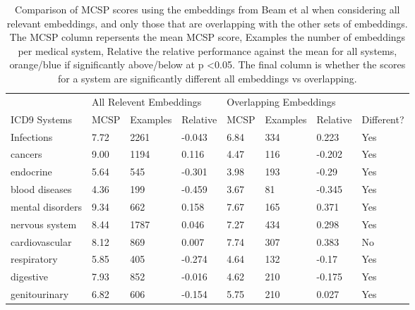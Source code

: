 \documentclass[10pt]{article}
\def\blu#1{{\color{blu}#1}}
\def\ora#1{{\color{ora}#1}}
\begin{document}
\begin{table*}[]
	\caption{Comparison of MCSP scores using the embeddings from Beam et al when considering all relevant embeddings, and only those that are overlapping with the other sets of embeddings. The MCSP column repersents the mean MCSP score, Examples the number of embeddings per medical system, Relative the relative performance against the mean for all systems, orange/blue if significantly above/below at p \textless 0.05. The final column is whether the scores for a system are significantly different all embeddings vs overlapping.}
	\label{tab:onlybeamonlymcsp}
	\begin{tabular}{llllllll}
		& \multicolumn{3}{l}{All Relevent Embeddings} & \multicolumn{3}{l}{Overlapping Embeddings} &            \\
		ICD9 Systems         & MCSP      & Examples     & Relative         & MCSP     & Examples     & Relative         & Different? \\
		Infections           & 7.72      & 2261         & \blu{-0.043}     & 6.84     & 334          & 0.223            & Yes        \\
		cancers              & 9.00      & 1194         & 0.116            & 4.47     & 116          & \blu{-0.202}     & Yes        \\
		endocrine            & 5.64      & 545          & \blu{-0.301}     & 3.98     & 193          & \blu{-0.29}      & Yes        \\
		blood diseases       & 4.36      & 199          & \blu{-0.459}     & 3.67     & 81           & \blu{-0.345}     & Yes        \\
		mental disorders     & 9.34      & 662          & 0.158            & 7.67     & 165          & 0.371            & Yes        \\
		nervous system       & 8.44      & 1787         & \ora{0.046}      & 7.27     & 434          & 0.298            & Yes        \\
		cardiovascular       & 8.12      & 869          & \ora{0.007}      & 7.74     & 307          & 0.383            & No         \\
		respiratory          & 5.85      & 405          & \blu{-0.274}     & 4.64     & 132          & \blu{-0.17}      & Yes        \\
		digestive            & 7.93      & 852          & \blu{-0.016}     & 4.62     & 210          & \blu{-0.175}     & Yes        \\
		genitourinary        & 6.82      & 606          & \blu{-0.154}     & 5.75     & 210          & \ora{0.027}      & Yes        \\

\end{tabular}
\end{table*}
\end{document}

